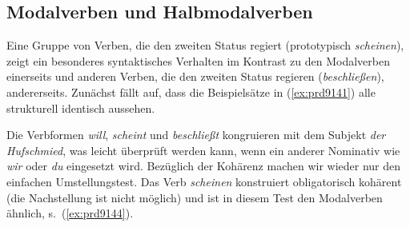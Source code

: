 \begin{exe}
\end{exe}


\subsection{Modalverben und Halbmodalverben}

\label{sec:halbmodale}

Eine Gruppe von Verben, die den zweiten Status regiert (prototypisch \textit{scheinen}), zeigt ein besonderes syntaktisches Verhalten im Kontrast zu den Modalverben einerseits und anderen Verben, die den zweiten Status regieren (\zB \textit{beschließen}), andererseits.
Zunächst fällt auf, dass die Beispielsätze in (\ref{ex:prd9141}) alle strukturell identisch aussehen.

\Enl

\begin{exe}
  \ex\label{ex:prd9141} 
  \begin{xlist}
  \end{xlist}
\end{exe}


Die Verbformen \textit{will}, \textit{scheint} und \textit{beschließt} kongruieren mit dem Subjekt \textit{der Hufschmied}, was leicht überprüft werden kann, wenn ein anderer Nominativ wie \textit{wir} oder \textit{du} eingesetzt wird.
Bezüglich der Kohärenz machen wir wieder nur den einfachen Umstellungstest.
Das Verb \textit{scheinen} konstruiert obligatorisch kohärent (die Nachstellung ist nicht möglich) und ist in diesem Test den Modalverben ähnlich, s.\ (\ref{ex:prd9144}).

\begin{exe}
  \ex\label{ex:prd9144} 
  \begin{xlist}
  \end{xlist}
\end{exe}

